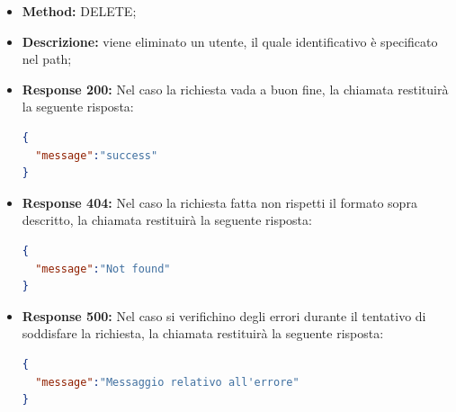 \begin{itemize}
\begin{itemize}
\item \textbf{Method:} DELETE;
\item \textbf{Descrizione:} viene eliminato un utente, il quale identificativo è specificato nel path;
\item \textbf{Response 200:} Nel caso la richiesta vada a buon fine, la chiamata restituirà la seguente risposta:
\begin{lstlisting}[language=json,firstnumber=1]
{
  "message":"success"
}
\end{lstlisting}
\item \textbf{Response 404:} Nel caso la richiesta fatta non rispetti il formato sopra descritto, la chiamata restituirà la seguente risposta:
\begin{lstlisting}[language=json,firstnumber=1]
{
  "message":"Not found"
}
\end{lstlisting}
\item \textbf{Response 500:} Nel caso si verifichino degli errori durante il tentativo di soddisfare la richiesta, la chiamata restituirà la seguente risposta:
\begin{lstlisting}[language=json,firstnumber=1]
{
  "message":"Messaggio relativo all'errore"
}
\end{lstlisting}
\end{itemize}


\end{itemize}
